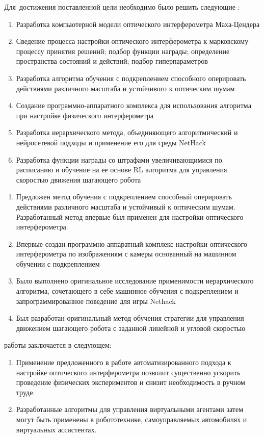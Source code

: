 Для~достижения поставленной цели необходимо было решить следующие {\tasks}:
\begin{enumerate}[beginpenalty=10000] %
  \item Разработка компьютерной модели оптического интерферометра Маха-Цендера
  \item Сведение процесса настройки оптического интерферометра к марковскому процессу принятия решений; подбор функции награды; определение пространства состояний и действий; подбор гиперпараметров
  \item Разработка алгоритма обучения с подкреплением способного оперировать действиями различного масштаба и устойчивого к оптическим шумам
  \item Создание программно-аппаратного комплекса для использования алгоритма при настройке физического интерферометра
  \item Разработка иерархического метода, объединяющего алгоритмический и нейросетевой подходы и применение его для среды NetHack
  \item Разработка функции награды со штрафами увеличивающимися по расписанию и обучение на ее основе RL алгоритма для управления скоростью движения шагающего робота %
\end{enumerate}


{\novelty}
\begin{enumerate}[beginpenalty=10000] %
  \item Предложен метод обучения с подкреплением способный оперировать действиями различного масштаба и устойчивый к оптическим шумам. Разработанный метод впервые был применен для настройки оптического интерферометра. 
  \item Впервые создан программно-аппаратный комплекс настройки оптического интерферометра по изображениям с камеры основанный на машинном обучении с подкреплением
  \item Было выполнено оригинальное исследование применимости иерархического алгоритма, сочетающего в себе машинное обучения с подкреплением и запрограммированное поведение для игры Nethack
  \item Был разработан оригинальный метод обучения стратегии для управления движением шагающего робота с заданной линейной и угловой скоростью
\end{enumerate}

{\influence} работы заключается в следующем:
\begin{enumerate}[beginpenalty=10000] %
  \item Применение предложенного в работе автоматизированного подхода к настройке оптического интерферометра позволит существенно ускорить проведение физических экспериментов и снизит необходимость в ручном труде. 
  \item Разработанные алгоритмы для управления виртуальными агентами затем могут быть применены в робототехнике, самоуправляемых автомобилях и виртуальных ассистентах. 
\end{enumerate}

